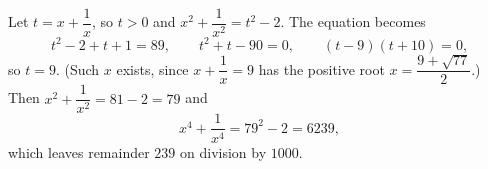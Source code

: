 Let $t=x+\dfrac{1}{x}$, so $t>0$ and $x^2+\dfrac{1}{x^2}=t^2-2$. The equation becomes
\[t^2-2+t+1=89,\qquad t^2+t-90=0,\qquad (t-9)(t+10)=0,\]
so $t=9$. (Such $x$ exists, since $x+\dfrac{1}{x}=9$ has the positive root $x=\dfrac{9+\sqrt{77}}{2}$.) Then $x^2+\dfrac{1}{x^2}=81-2=79$ and
\[x^4+\dfrac{1}{x^4}=79^2-2=6239 ,\]
which leaves remainder $\boxed{239}$ on division by $1000$.
